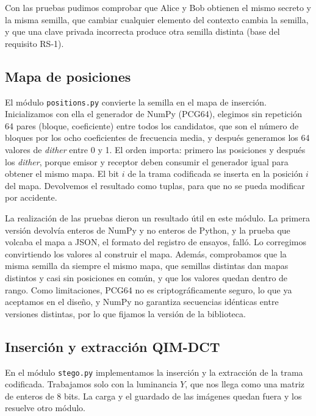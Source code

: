 \documentclass[IB]{TFUOC}%
\begin{document}
Con las pruebas pudimos comprobar que Alice y Bob  obtienen el mismo secreto y la misma semilla, que cambiar cualquier elemento del contexto cambia la 
semilla, y que una clave privada incorrecta produce otra semilla distinta (base del requisito RS-1).

\subsection{Mapa de posiciones}
\label{subsec:impl_positions}

El módulo \texttt{positions.py} convierte la semilla en el mapa de inserción. Inicializamos con ella el generador
 de NumPy (PCG64), elegimos sin repetición 64 pares (bloque, coeficiente) entre todos los candidatos,
 que son el número de bloques por los ocho coeficientes de frecuencia media, y después generamos los 64 valores de \textit{dither} entre 0 y 1. El orden importa: primero las posiciones y después los \textit{dither}, porque emisor y receptor deben consumir el generador igual para obtener el mismo mapa. El bit $i$ de la trama codificada se inserta en la posición $i$ del mapa. Devolvemos el resultado como tuplas, para que no se pueda modificar por accidente.

La realización de las pruebas dieron un resultado útil en este módulo. La primera versión devolvía enteros de NumPy y no enteros de Python, y la prueba que volcaba el mapa a JSON, el formato del registro de ensayos, falló. Lo corregimos convirtiendo los valores al construir el mapa. Además, comprobamos que la misma semilla da siempre el mismo mapa, que semillas distintas dan mapas distintos y casi sin posiciones en común, y que los valores quedan dentro de rango. Como limitaciones, PCG64 no es criptográficamente seguro, lo que ya aceptamos en el diseño, y NumPy no garantiza secuencias idénticas entre versiones distintas, por lo que fijamos la versión de la biblioteca.

\subsection{Inserción y extracción QIM-DCT}
\label{subsec:impl_stego}

En el módulo \texttt{stego.py} implementamos la inserción y la extracción de la trama codificada. Trabajamos solo 
con la luminancia $Y$, que nos llega como una matriz de enteros de 8 bits. La carga y el guardado 
de las imágenes quedan fuera y los resuelve otro módulo.
\end{document}
